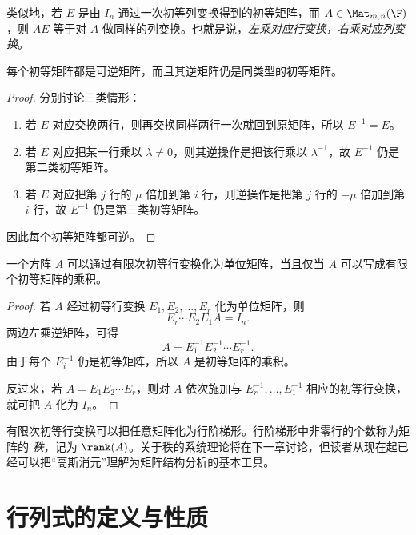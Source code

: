 \begin{remark}
类似地，若 $E$ 是由 $I_n$ 通过一次初等列变换得到的初等矩阵，而 $A\in\Mat_{m,n}(\F)$，则 $AE$ 等于对 $A$ 做同样的列变换。也就是说，\emph{左乘对应行变换，右乘对应列变换}。
\end{remark}

\begin{proposition}[初等矩阵可逆]
每个初等矩阵都是可逆矩阵，而且其逆矩阵仍是同类型的初等矩阵。
\end{proposition}

\begin{proof}
分别讨论三类情形：
\begin{enumerate}[label=(\arabic*)]
  \item 若 $E$ 对应交换两行，则再交换同样两行一次就回到原矩阵，所以 $E^{-1}=E$。
  \item 若 $E$ 对应把某一行乘以 $\lambda\ne 0$，则其逆操作是把该行乘以 $\lambda^{-1}$，故 $E^{-1}$ 仍是第二类初等矩阵。
  \item 若 $E$ 对应把第 $j$ 行的 $\mu$ 倍加到第 $i$ 行，则逆操作是把第 $j$ 行的 $-\mu$ 倍加到第 $i$ 行，故 $E^{-1}$ 仍是第三类初等矩阵。
\end{enumerate}
因此每个初等矩阵都可逆。
\end{proof}

\begin{proposition}
一个方阵 $A$ 可以通过有限次初等行变换化为单位矩阵，当且仅当 $A$ 可以写成有限个初等矩阵的乘积。
\end{proposition}

\begin{proof}
若 $A$ 经过初等行变换 $E_1,E_2,\dots,E_r$ 化为单位矩阵，则
\[
E_r\cdots E_2E_1A=I_n.
\]
两边左乘逆矩阵，可得
\[
A=E_1^{-1}E_2^{-1}\cdots E_r^{-1}.
\]
由于每个 $E_i^{-1}$ 仍是初等矩阵，所以 $A$ 是初等矩阵的乘积。

反过来，若 $A=E_1E_2\cdots E_r$，则对 $A$ 依次施加与 $E_r^{-1},\dots,E_1^{-1}$ 相应的初等行变换，就可把 $A$ 化为 $I_n$。
\end{proof}

\begin{remark}
有限次初等行变换可以把任意矩阵化为行阶梯形。行阶梯形中非零行的个数称为矩阵的 \emph{秩}，记为 $\rank(A)$。关于秩的系统理论将在下一章讨论，但读者从现在起已经可以把“高斯消元”理解为矩阵结构分析的基本工具。
\end{remark}

\section{行列式的定义与性质}

